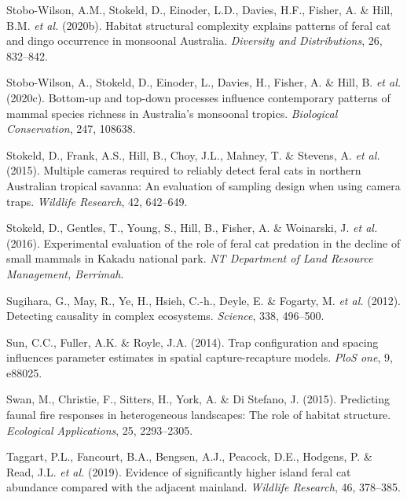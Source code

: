 \documentclass[11pt,a4paper,titlepage,twoside,openright]{style/unimelbthesis}
\begin{document}
\begin{mainmatter}
\leavevmode\hypertarget{ref-stobo2020habitat}{}%
Stobo-Wilson, A.M., Stokeld, D., Einoder, L.D., Davies, H.F., Fisher, A. \& Hill, B.M. \emph{et al.} (2020b). Habitat structural complexity explains patterns of feral cat and dingo occurrence in monsoonal Australia. \emph{Diversity and Distributions}, 26, 832--842.

\leavevmode\hypertarget{ref-stobo2020bottom}{}%
Stobo-Wilson, A., Stokeld, D., Einoder, L., Davies, H., Fisher, A. \& Hill, B. \emph{et al.} (2020c). Bottom-up and top-down processes influence contemporary patterns of mammal species richness in Australia's monsoonal tropics. \emph{Biological Conservation}, 247, 108638.

\leavevmode\hypertarget{ref-stokeld2015multiple}{}%
Stokeld, D., Frank, A.S., Hill, B., Choy, J.L., Mahney, T. \& Stevens, A. \emph{et al.} (2015). Multiple cameras required to reliably detect feral cats in northern Australian tropical savanna: An evaluation of sampling design when using camera traps. \emph{Wildlife Research}, 42, 642--649.

\leavevmode\hypertarget{ref-stokeld2016experimental}{}%
Stokeld, D., Gentles, T., Young, S., Hill, B., Fisher, A. \& Woinarski, J. \emph{et al.} (2016). Experimental evaluation of the role of feral cat predation in the decline of small mammals in Kakadu national park. \emph{NT Department of Land Resource Management, Berrimah}.

\leavevmode\hypertarget{ref-sugihara2012detecting}{}%
Sugihara, G., May, R., Ye, H., Hsieh, C.-h., Deyle, E. \& Fogarty, M. \emph{et al.} (2012). Detecting causality in complex ecosystems. \emph{Science}, 338, 496--500.

\leavevmode\hypertarget{ref-sun2014trap}{}%
Sun, C.C., Fuller, A.K. \& Royle, J.A. (2014). Trap configuration and spacing influences parameter estimates in spatial capture-recapture models. \emph{PloS one}, 9, e88025.

\leavevmode\hypertarget{ref-swan2015predicting}{}%
Swan, M., Christie, F., Sitters, H., York, A. \& Di Stefano, J. (2015). Predicting faunal fire responses in heterogeneous landscapes: The role of habitat structure. \emph{Ecological Applications}, 25, 2293--2305.

\leavevmode\hypertarget{ref-taggart2019evidence}{}%
Taggart, P.L., Fancourt, B.A., Bengsen, A.J., Peacock, D.E., Hodgens, P. \& Read, J.L. \emph{et al.} (2019). Evidence of significantly higher island feral cat abundance compared with the adjacent mainland. \emph{Wildlife Research}, 46, 378--385.


\end{mainmatter}
\end{document}
